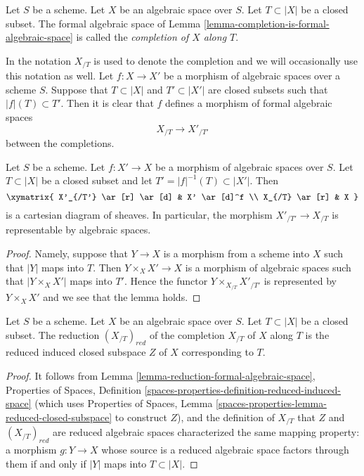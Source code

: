 \begin{definition}
\label{definition-completion}
Let $S$ be a scheme. Let $X$ be an algebraic space over $S$.
Let $T \subset |X|$ be a closed subset. The formal algebraic space
of Lemma \ref{lemma-completion-is-formal-algebraic-space}
is called the {\it completion of $X$ along $T$}.
\end{definition}

\noindent
In \cite[Chapter I, Section 10.8]{EGA} the notation $X_{/T}$
is used to denote the completion and we will occasionally use
this notation as well. Let $f : X \to X'$ be
a morphism of algebraic spaces over a scheme $S$. Suppose
that $T \subset |X|$ and $T' \subset |X'|$ are closed subsets
such that $|f|(T) \subset T'$. Then it is clear that
$f$ defines a morphism of formal algebraic spaces
$$
X_{/T} \longrightarrow X'_{/T'}
$$
between the completions.

\begin{lemma}
\label{lemma-map-completions-representable}
Let $S$ be a scheme. Let $f : X' \to X$ be a morphism
of algebraic spaces over $S$. Let $T \subset |X|$
be a closed subset and let $T' = |f|^{-1}(T) \subset |X'|$.
Then
$$
\xymatrix{
X'_{/T'} \ar[r] \ar[d] & X' \ar[d]^f \\
X_{/T} \ar[r] & X
}
$$
is a cartesian diagram of sheaves. In particular, the morphism
$X'_{/T'} \to X_{/T}$ is representable by algebraic spaces.
\end{lemma}

\begin{proof}
Namely, suppose that $Y \to X$ is a morphism from a scheme into $X$ such
that $|Y|$ maps into $T$. Then $Y \times_X X' \to X$ is a morphism of
algebraic spaces such that $|Y \times_X X'|$ maps into $T'$. Hence the
functor $Y \times_{X_{/T}} X'_{/T'}$ is represented by $Y \times_X X'$
and we see that the lemma holds.
\end{proof}

\begin{lemma}
\label{lemma-reduction-completion}
Let $S$ be a scheme. Let $X$ be an algebraic space over $S$.
Let $T \subset |X|$ be a closed subset. The reduction $(X_{/T})_{red}$
of the completion $X_{/T}$ of $X$ along $T$ is
the reduced induced closed subspace $Z$ of $X$ corresponding to $T$.
\end{lemma}

\begin{proof}
It follows from Lemma \ref{lemma-reduction-formal-algebraic-space},
Properties of Spaces, Definition
\ref{spaces-properties-definition-reduced-induced-space}
(which uses Properties of Spaces, Lemma
\ref{spaces-properties-lemma-reduced-closed-subspace} to construct $Z$),
and the definition of $X_{/T}$ that
$Z$ and $(X_{/T})_{red}$ are reduced algebraic spaces
characterized the same mapping property:
a morphism $g : Y \to X$ whose source is a reduced algebraic space
factors through them if and only if $|Y|$ maps into $T \subset |X|$.
\end{proof}


